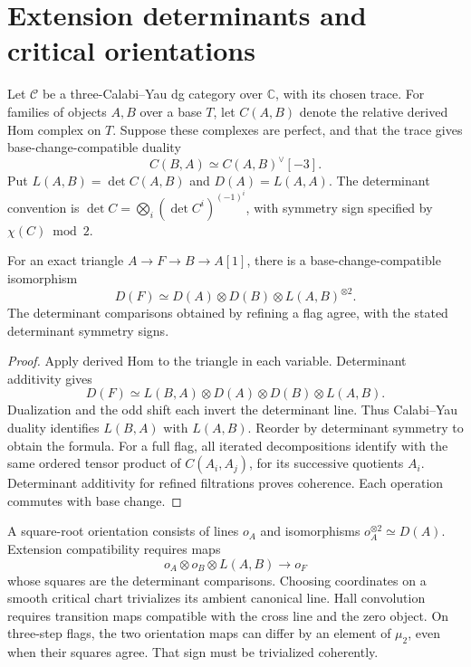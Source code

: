 \chapter{Extension determinants and critical orientations}
Let \(\mathcal C\) be a three-Calabi--Yau dg category over
\(\mathbb C\), with its chosen trace. For families of objects
\(A,B\) over a base \(T\), let \(C(A,B)\) denote the relative
derived Hom complex on \(T\). Suppose these complexes are perfect,
and that the trace gives base-change-compatible duality
\[
 C(B,A)\simeq C(A,B)^\vee[-3].
\]
Put \(L(A,B)=\det C(A,B)\) and \(D(A)=L(A,A)\).
The determinant convention is
\(\det C=\bigotimes_i(\det C^i)^{(-1)^i}\), with symmetry sign
specified by \(\chi(C)\bmod2\).

\begin{theorem}
For an exact triangle \(A\to F\to B\to A[1]\), there is a
base-change-compatible isomorphism
\[
 D(F)\simeq D(A)\otimes D(B)\otimes L(A,B)^{\otimes2}.
\]
The determinant comparisons obtained by refining a flag agree, with
the stated determinant symmetry signs.
\end{theorem}
\begin{proof}
Apply derived Hom to the triangle in each variable. Determinant
additivity gives
\[
 D(F)\simeq L(B,A)\otimes D(A)\otimes D(B)\otimes L(A,B).
\]
Dualization and the odd shift each invert the determinant line.
Thus Calabi--Yau duality identifies \(L(B,A)\) with \(L(A,B)\).
Reorder by determinant symmetry to obtain the formula. For a full
flag, all iterated decompositions identify with the same ordered
tensor product of \(C(A_i,A_j)\), for its successive quotients
\(A_i\). Determinant additivity for refined filtrations proves
coherence. Each operation commutes with base change.
\end{proof}

A square-root orientation consists of lines \(o_A\) and
isomorphisms \(o_A^{\otimes2}\simeq D(A)\). Extension
compatibility requires maps
\[
 o_A\otimes o_B\otimes L(A,B)\longrightarrow o_F
\]
whose squares are the determinant comparisons. Choosing coordinates
on a smooth critical chart trivializes its ambient canonical line.
Hall convolution requires transition maps compatible with the cross
line and the zero object. On three-step flags, the two orientation
maps can differ by an element of \(\mu_2\), even when their
squares agree. That sign must be trivialized coherently.

